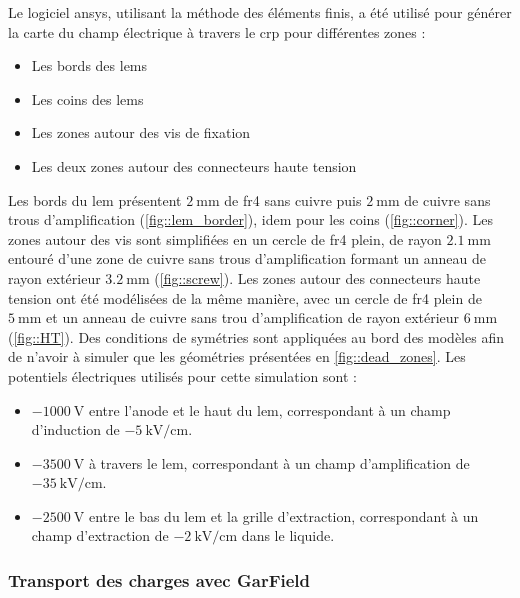         Le logiciel \gls{ansys}, utilisant la méthode des éléments finis, a été utilisé pour générer la carte du champ électrique à travers le \gls{crp} pour différentes zones :
        \begin{itemize}
          \item Les bords des \glspl{lem}
          \item Les coins des \glspl{lem}
          \item Les zones autour des vis de fixation
          \item Les deux zones autour des connecteurs haute tension
        \end{itemize}
        Les bords du \gls{lem} présentent $\SI{2}{\milli\meter}$ de \gls{fr4} sans cuivre puis $\SI{2}{\milli\meter}$ de cuivre sans trous d'amplification (\autoref{fig::lem_border}), idem pour les coins (\autoref{fig::corner}). Les zones autour des vis sont simplifiées en un cercle de \gls{fr4} plein, de rayon $\SI{2.1}{\milli\meter}$ entouré d'une zone de cuivre sans trous d'amplification formant un anneau de rayon extérieur $\SI{3.2}{\milli\meter}$ (\autoref{fig::screw}). Les zones autour des connecteurs haute tension ont été modélisées de la même manière, avec un cercle de \gls{fr4} plein de $\SI{5}{\milli\meter}$ et un anneau de cuivre sans trou d'amplification de rayon extérieur $\SI{6}{\milli\meter}$ (\autoref{fig::HT}). Des conditions de symétries sont appliquées au bord des modèles afin de n'avoir à simuler que les géométries présentées en \autoref{fig::dead_zones}. 
        Les potentiels électriques utilisés pour cette simulation sont : 
        \begin{itemize}
          \item $\SI{-1000}{\volt}$ entre l'anode et le haut du \gls{lem}, correspondant à un champ d'induction de $\SI{-5}{\kilo\volt\per\centi\meter}$.
          \item $\SI{-3500}{\volt}$ à travers le \gls{lem}, correspondant à un champ d'amplification de $\SI{-35}{\kilo\volt\per\centi\meter}$.
          \item $\SI{-2500}{\volt}$ entre le bas du \gls{lem} et la grille d'extraction, correspondant à un champ d'extraction de $\SI{-2}{\kilo\volt\per\centi\meter}$ dans le liquide.
        \end{itemize}
                
      \subsubsection{Transport des charges avec GarField}
            
